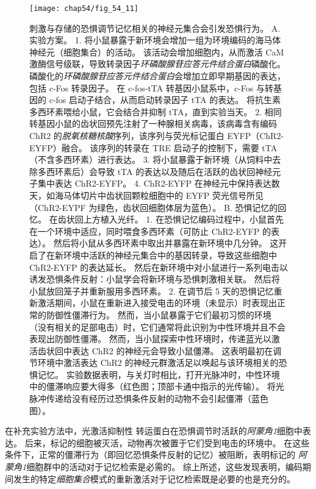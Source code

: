 \begin{figure}[htbp]
	\centering
	\texttt{[image: chap54/fig\_54\_11]}
	\caption{刺激与存储的恐惧调节记忆相关的神经元集合会引发恐惧行为\cite{liu2012optogenetic}。
		A. 实验方案。
		1. 将小鼠暴露于新环境会增加一组为环境编码的海马体神经元（细胞集合）的活动。
		该活动会增加细胞内，从而激活 CaM 激酶信号级联，导致转录因子\textit{环磷酸腺苷应答元件结合蛋白}磷酸化。
		磷酸化的\textit{环磷酸腺苷应答元件结合蛋白}会增加立即早期基因的表达，包括 c-Fos 转录因子。
		在 c-fos-tTA 转基因小鼠系中，c-Fos 与转基因的 c-fos 启动子结合，从而启动转录因子 tTA 的表达。
		将抗生素多西环素喂给小鼠，它会结合并抑制 tTA，直到实验当天。
		2. 相同转基因小鼠的齿状回预先注射了一种腺相关病毒，该病毒含有编码 ChR2 的\textit{脱氧核糖核酸}序列，该序列与荧光标记蛋白 EYFP（ChR2-EYFP）融合。
		该序列的转录在 TRE 启动子的控制下，需要 tTA（不含多西环素）进行表达。
		3. 将小鼠暴露于新环境（从饲料中去除多西环素后）会导致 tTA 的表达以及随后在活跃的齿状回神经元子集中表达 ChR2-EYFP。
		4. ChR2-EYFP 在神经元中保持表达数天，如海马体切片中齿状回颗粒细胞中的 EYFP 荧光信号所见（ChR2-EYPF 为绿色，齿状回细胞体层为蓝色）。 
		B. 恐惧记忆的回忆。
		在齿状回上方植入光纤。
		1. 在恐惧记忆编码过程中，小鼠首先在一个环境中适应，同时喂食多西环素（可防止 ChR2-EYFP 的表达）。
		然后将小鼠从多西环素中取出并暴露在新环境中几分钟。
		这开启了在新环境中活跃的神经元集合中的基因转录，导致这些细胞中 ChR2-EYFP 的表达延长。
		然后在新环境中对小鼠进行一系列电击以诱发恐惧条件反射：小鼠学会将新环境与恐惧刺激相关联。
		然后将小鼠放回笼子并重新服用多西环素。
		2. 在调节后 5 天的恐惧记忆重新激活期间，小鼠在重新进入接受电击的环境（未显示）时表现出正常的防御性僵滞行为。
		然而，当小鼠暴露于它们最初习惯的环境（没有相关的足部电击）时，它们通常将此识别为中性环境并且不会表现出防御性僵滞。
		然而，当小鼠探索中性环境时，传递蓝光以激活齿状回中表达 ChR2 的神经元会导致小鼠僵滞。
		这表明最初在调节环境中激活表达 ChR2 的神经元群激活足以唤起与该环境相关的恐惧记忆。
		实验数据表明，与关灯时相比，打开光脉冲时，中性环境中的僵滞响应要大得多（红色图；顶部卡通中指示的光传输）。
		将光脉冲传递给没有经历过恐惧条件反射的动物不会引起僵滞（蓝色图）。}
	\label{fig:54_11}
\end{figure}


在补充实验方法中，光激活抑制性  转运蛋白在恐惧调节时活跃的\textit{阿蒙角1}细胞中表达。
后来，标记的细胞被灭活，动物再次被置于它们受到电击的环境中。
在这些条件下，正常的僵滞行为（即回忆恐惧条件反射的记忆）被阻断，表明标记的 \textit{阿蒙角1}细胞群中的活动对于记忆检索是必需的。
综上所述，这些发现表明，编码期间发生的特定\textit{细胞集合}模式的重新激活对于记忆检索既是必要的也是充分的。


